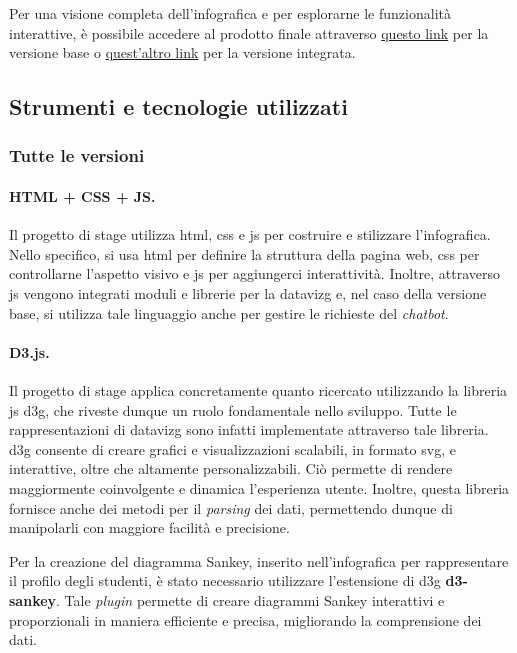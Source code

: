 Per una visione completa dell'infografica e per esplorarne le funzionalità interattive, è possibile accedere al prodotto finale attraverso \href{https://github.com/jeskarr/progetto_stage/tree/main/infographic-example}{questo link} 
per la versione base o \href{https://github.com/jeskarr/progetto_stage/tree/VERSIONE_INTEGRATA/infographic-example}{quest'altro link} per la versione integrata.


\subsection{Strumenti e tecnologie utilizzati}\label{subsec:tecnologie}
\subsubsection{Tutte le versioni}
\paragraph{HTML + CSS + JS.}
Il progetto di stage utilizza \gls{html}, \gls{css} e \gls{js} per costruire e stilizzare l'infografica. Nello specifico, si usa \gls{html} per definire la struttura della pagina web, \gls{css} per controllarne l'aspetto visivo 
e \gls{js} per aggiungerci interattività. Inoltre, attraverso \gls{js} vengono integrati moduli e librerie per la \gls{datavizg} e, nel caso della versione base, si utilizza tale linguaggio anche per gestire le richieste del \emph{chatbot}.

\paragraph{D3.js.}
Il progetto di stage applica concretamente quanto ricercato utilizzando la libreria \gls{js} \gls{d3g}, che riveste dunque un ruolo fondamentale nello sviluppo.
Tutte le rappresentazioni di \gls{datavizg} sono infatti implementate attraverso tale libreria.
\gls{d3g} consente di creare grafici e visualizzazioni scalabili, in formato \gls{svg}, e interattive, oltre che altamente personalizzabili. 
Ciò permette di rendere maggiormente coinvolgente e dinamica l'esperienza utente. 
Inoltre, questa libreria fornisce anche dei metodi per il \emph{parsing} dei dati, permettendo dunque di manipolarli con maggiore facilità e precisione.

Per la creazione del diagramma Sankey, inserito nell'infografica per rappresentare il profilo degli studenti, è stato necessario utilizzare l'estensione di \gls{d3g}
\textbf{d3-sankey}. Tale \emph{plugin} permette di creare diagrammi Sankey interattivi e proporzionali in maniera efficiente e precisa, migliorando la comprensione dei dati.


